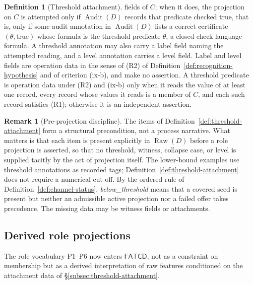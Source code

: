 \documentclass[11pt]{article}
\theoremstyle{definition}
\newtheorem{definition}[theorem]{Definition}
\newtheorem{remark}[theorem]{Remark}
\newcommand{\FATCD}{\ensuremath{\mathsf{FATCD}}}
\newcommand{\Raw}[1]{\ensuremath{\operatorname{Raw}\!\left(#1\right)}}
\newcommand{\Audit}[1]{\ensuremath{\operatorname{Audit}\!\left(#1\right)}}
\newcommand{\belowthr}{\textit{below\_\allowbreak threshold}}
\newcommand{\Pone}{\ensuremath{\mathrm{P1}}}
\newcommand{\Psix}{\ensuremath{\mathrm{P6}}}
\begin{document}
\begin{definition}[Threshold attachment]
fields of \(C\); when it does, the projection on \(C\) is attempted only if
\(\Audit{D}\) records that predicate checked true, that is, only if some audit annotation in \(\Audit{D}\) lists a correct certificate \((\theta,\mathrm{true})\) whose formula is the threshold predicate \(\theta\), a closed check-language formula. A threshold annotation may
also carry a label field naming the attempted reading, and a level annotation
carries a level field. Label and level fields are operation data in the sense
of (R2) of Definition~\ref{def:recognition-hypothesis} and of criterion (ix-b),
and make no assertion. A threshold predicate is operation data under (R2) and
(ix-b) only when it reads the value of at least one record, every record whose values it reads is a member of \(C\), and each such record satisfies (R1); otherwise
it is an independent assertion.
\end{definition}

\begin{remark}[Pre-projection discipline]\label{rem:pre-projection}
The items of Definition~\ref{def:threshold-attachment} form a structural
precondition, not a process narrative. What matters is that each item is
present explicitly in \(\Raw{D}\) before a role projection is asserted, so
that no threshold, witness, collapse case, or level is supplied tacitly by
the act of projection itself. The lower-bound examples use threshold
annotations as recorded tags; Definition~\ref{def:threshold-attachment} does
not require a numerical cut-off. By the ordered rule of
Definition~\ref{def:channel-status}, \belowthr{} means that a covered seed is
present but neither an admissible active projection nor a failed offer takes
precedence. The missing data may be witness fields or attachments.
\end{remark}

\subsection{Derived role projections}\label{subsec:derived-role-projections}

The role vocabulary \Pone{}--\Psix{} now enters \FATCD{}, not as a
constraint on membership but as a derived interpretation of raw
features conditioned on the attachment data of
\S\ref{subsec:threshold-attachment}.
\end{document}
